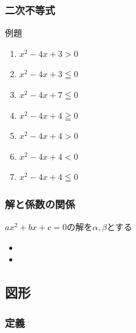 \documentclass[10pt,dvipdfmx]{jsarticle}
\begin{document}
\subsubsection*{二次不等式}
\begin{itembox}[l]{例題}
  \begin{large}
    \begin{multicols}{2}
      \begin{enumerate}
        \item $x^2-4x+3>0$
        \item $x^2-4x+3\leqq0$
        \item $x^2-4x+7\leqq0$
        \item $x^2-4x+4\geqq0$
        \item $x^2-4x+4>0$
        \item  $x^2-4x+4<0$
        \item $x^2-4x+4\leqq0$
      \end{enumerate}
    \end{multicols}
  \end{large}

\end{itembox}

\subsubsection*{解と係数の関係}
$ax^2+bx+c=0$の解を$\alpha,\beta$とする
\begin{multicols}{2}
  \begin{itemize}
    \item \item
  \end{itemize}
\end{multicols}


\newpage
\subsection*{図形}
\subsubsection*{定義}
\begin{minipage}[t]{0.5\textwidth}
\end{minipage}
\end{document}
